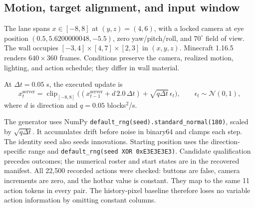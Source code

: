 \documentclass{article}
\begin{document}
\subsection{Motion, target alignment, and input window}
The lane spans $x\in[-8,8]$ at $(y,z)=(4,6)$, with a locked camera at eye position $(0.5,5.6200000048,-5.5)$, zero yaw/pitch/roll, and $70^\circ$ field of view. The wall occupies $[-3,4]\times[4,7]\times[2,3]$ in $(x,y,z)$. Minecraft 1.16.5 renders $640\times360$ frames. Conditions preserve the camera, realized motion, lighting, and action schedule; they differ in wall material.

At $\Delta t=0.05$ s, the executed update is
\[
x^{\mathrm{server}}_t=\operatorname{clip}_{[-8,8]}
 \bigl((x^{\mathrm{server}}_{t-1}+d\,2.0\,\Delta t)+\sqrt{q\Delta t}\,\epsilon_t\bigr),
\qquad \epsilon_t\sim\mathcal N(0,1),
\]
where $d$ is direction and $q=0.05$ blocks$^2$/s.

The generator uses NumPy \texttt{default\_rng(seed).standard\_normal(180)}, scaled by $\sqrt{q\Delta t}$. It accumulates drift before noise in binary64 and clamps each step. The identity seed also seeds innovations. Starting position uses the direction-specific range and \texttt{default\_rng(seed XOR 0xE3E3E3E3)}. Candidate qualification precedes outcomes; the numerical roster and start states are in the recovered manifest. All 22,500 recorded actions were checked: buttons are false, camera increments are zero, and the hotbar value is constant. They map to the same 11 action tokens in every pair. The history-pixel baseline therefore loses no variable action information by omitting constant columns.
\end{document}
